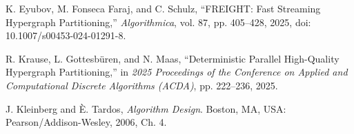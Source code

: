 
K. Eyubov, M. Fonseca Faraj, and C. Schulz,
``FREIGHT: Fast Streaming Hypergraph Partitioning,''
\emph{Algorithmica}, vol. 87, pp. 405--428, 2025,
doi: 10.1007/s00453-024-01291-8.

R. Krause, L. Gottesb\"uren, and N. Maas,
``Deterministic Parallel High-Quality Hypergraph Partitioning,''
in \emph{2025 Proceedings of the Conference on Applied and Computational Discrete Algorithms (ACDA)},
pp. 222--236, 2025.

J. Kleinberg and \`E. Tardos,
\emph{Algorithm Design}. Boston, MA, USA: Pearson/Addison-Wesley, 2006, Ch. 4.
